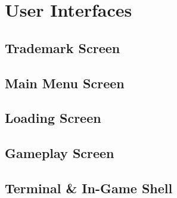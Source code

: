 \section{User Interfaces} \label{sec:userinterfaces}


\subsection{Trademark Screen}

\subsection{Main Menu Screen}

\subsection{Loading Screen}

\subsection{Gameplay Screen}

\subsection{Terminal \& In-Game Shell}

